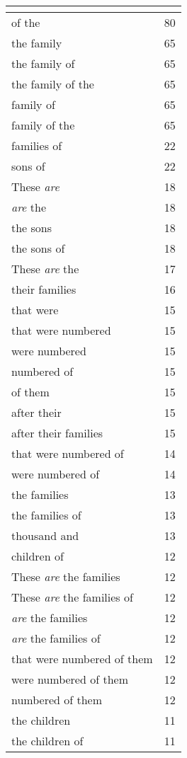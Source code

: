 \begin{center}
\begin{longtable}{|p{3.0in}|p{0.5in}|}
\hline \multicolumn{2}{c}{{ }} \\ \hline
\endfoot 
of the & 80\\ \hline 
the family & 65\\ \hline 
the family of & 65\\ \hline 
the family of the & 65\\ \hline 
family of & 65\\ \hline 
family of the & 65\\ \hline 
families of & 22\\ \hline 
sons of & 22\\ \hline 
These \emph{are} & 18\\ \hline 
\emph{are} the & 18\\ \hline 
the sons & 18\\ \hline 
the sons of & 18\\ \hline 
These \emph{are} the & 17\\ \hline 
their families & 16\\ \hline 
that were & 15\\ \hline 
that were numbered & 15\\ \hline 
were numbered & 15\\ \hline 
numbered of & 15\\ \hline 
of them & 15\\ \hline 
after their & 15\\ \hline 
after their families & 15\\ \hline 
that were numbered of & 14\\ \hline 
were numbered of & 14\\ \hline 
the families & 13\\ \hline 
the families of & 13\\ \hline 
thousand and & 13\\ \hline 
children of & 12\\ \hline 
These \emph{are} the families & 12\\ \hline 
These \emph{are} the families of & 12\\ \hline 
\emph{are} the families & 12\\ \hline 
\emph{are} the families of & 12\\ \hline 
that were numbered of them & 12\\ \hline 
were numbered of them & 12\\ \hline 
numbered of them & 12\\ \hline 
the children & 11\\ \hline 
the children of & 11\\ \hline 

\end{longtable}
\end{center}
